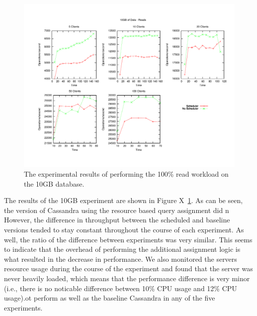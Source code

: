 \documentclass[]{acm_proc_article-sp}
\begin{document}
\begin{figure}[t]
\centering
\includegraphics[scale=0.563]{images/10GB_Reads.pdf}
\vspace{-15pt}
\caption{The experimental results of performing the 100\% read workload on the 10GB database.}
\label{fig:10g_reads}
\end{figure}

The results of the 10GB experiment are shown in Figure X~\ref{fig:10g_reads}. As can be seen, the version of Cassandra using the resource based query assignment did n However, the difference in throughput between the scheduled and baseline versions tended to stay constant throughout the course of each experiment. As well, the ratio of the difference between experiments was very similar. This seems to indicate that the overhead of performing the additional assignment logic is what resulted in the decrease in performance. We also monitored the servers resource usage during the course of the experiment and found that the server was never heavily loaded, which means that the performance difference is very minor (i.e., there is no noticable difference between 10\% CPU usage and 12\% CPU usage).ot perform as well as the baseline Cassandra in any of the five experiments.
\end{document}
